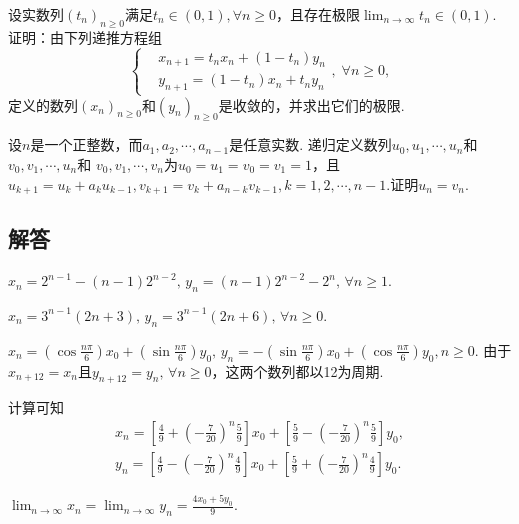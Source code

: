 \begin{problem}
  设实数列$(t_n)_{n\ge0}$满足$t_n\in(0,1),\forall n\ge0$，且存在极限$\lim_{n\to\infty}t_n\in(0,1)$. 证明：由下列递推方程组
  \[
    \left\{
      \begin{aligned}
        & x_{n+1} = t_nx_n + (1 - t_n)y_n \\
        & y_{n+1} = (1 - t_n)x_n + t_ny_n
      \end{aligned}
    \right.,\; \forall n\ge0,
  \]
  定义的数列$(x_n)_{n\ge0}$和$(y_n)_{n\ge0}$是收敛的，并求出它们的极限.
\end{problem}

\begin{problem}

  设$n$是一个正整数，而$a_1,a_2,\cdots,a_{n-1}$是任意实数. 递归定义数列$u_0,u_1,\cdots,u_n$和$v_0,v_1,\cdots,u_n$和
  $v_0,v_1,\cdots,v_n$为$u_0=u_1=v_0=v_1=1$，且$u_{k+1}
  =u_k+a_ku_{k-1},v_{k+1}=v_k+a_{n-k}v_{k-1},k=1,2,\cdots,n-1$.证明$u_n=v_n$.
\end{problem}

\subsection{解答}
\begin{solution}
  $x_n=2^{n-1}-(n-1)2^{n-2},\,y_n=(n-1)2^{n-2}-2^n,\,\forall n\ge1$.
\end{solution}

\begin{solution}
  $x_n=3^{n-1}(2n+3),\,y_n=3^{n-1}(2n+6),\,\forall n\ge0$.
\end{solution}

\begin{solution}
  $x_n=\left(\cos\frac{n\pi}6\right)x_0
  +\left(\sin\frac{n\pi}6\right)y_0,
  \,y_n=-\left(\sin\frac{n\pi}6\right)x_0
  +\left(\cos\frac{n\pi}6\right)y_0,n\ge0$. 由于$x_{n+12}=x_n$且$y_{n+12}=y_n,\,\forall n\ge0$，这两个数列都以12为周期.
\end{solution}

\begin{solution}
  \begin{inparaenum}[(a)]
    \item 计算可知
    \begin{gather*}
      x_n = \left[ \frac49 + \left( -\frac7{20} \right)^n\frac59 \right]x_0 + \left[ \frac59 - \left( -\frac7{20} \right)^n\frac59 \right]y_0 , \\
      y_n = \left[ \frac49 - \left( -\frac7{20} \right)^n\frac49 \right]x_0 + \left[ \frac59 + \left( -\frac7{20} \right)^n\frac49 \right]y_0.
    \end{gather*}
    \item $\lim_{n\to\infty}x_n=\lim_{n\to\infty}y_n
        =\frac{4x_0+5y_0}9$.
  \end{inparaenum}
\end{solution}

